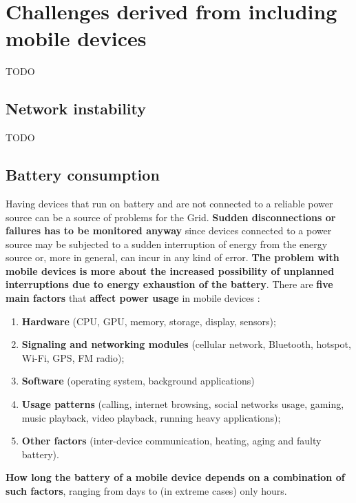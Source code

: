 \section{Challenges derived from including mobile devices}\label{challenges_derived_from_mobile_devides}
TODO

\subsection{Network instability}
TODO

\subsection{Battery consumption}
Having devices that run on battery and are not connected to a reliable power source can be a source of problems for the Grid. \textbf{Sudden disconnections or failures has to be monitored anyway} since devices connected to a power source may be subjected to a sudden interruption of energy from the energy source or, more in general, can incur in any kind of error. \textbf{The problem with mobile devices is more about the increased possibility of unplanned interruptions due to energy exhaustion of the battery}.
There are \textbf{five main factors} that \textbf{affect power usage} in mobile devices \cite{mobile_power_consumption}:
\begin{enumerate}
    \item \textbf{Hardware} (CPU, GPU, memory, storage, display, sensors);
    \item \textbf{Signaling and networking modules} (cellular network, Bluetooth, hotspot, Wi-Fi, GPS, FM radio);
    \item \textbf{Software} (operating system, background applications)
    \item \textbf{Usage patterns} (calling, internet browsing, social networks usage, gaming, music playback, video playback, running heavy applications);
    \item \textbf{Other factors} (inter-device communication, heating, aging and faulty battery).
\end{enumerate}
\textbf{How long the battery of a mobile device depends on a combination of such factors}, ranging from days to (in extreme cases) only hours.

